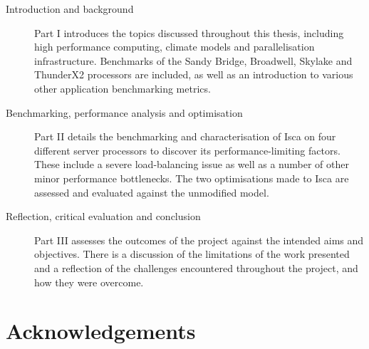 \documentclass[a4paper,11pt]{report}
\begin{document}
\begin{description}

	\item[Introduction and background] Part I introduces the topics discussed throughout this thesis, including high performance computing, climate models and parallelisation infrastructure. Benchmarks of the Sandy Bridge, Broadwell, Skylake and ThunderX2 processors are included, as well as an introduction to various other application benchmarking metrics. 
	
	\item[Benchmarking, performance analysis and optimisation] Part II details the benchmarking and characterisation of Isca on four different server processors to discover its performance-limiting factors. These include a severe load-balancing issue as well as a number of other minor performance bottlenecks. The two optimisations made to Isca are assessed and evaluated against the unmodified model. 
	
	\item[Reflection, critical evaluation and conclusion] Part III assesses the outcomes of the project against the intended aims and objectives. There is a discussion of the limitations of the work presented and a reflection of the challenges encountered throughout the project, and how they were overcome.
\end{description}

  

\chapter*{Acknowledgements}
%
%
%
\end{document}
